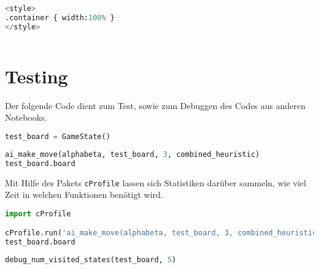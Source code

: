 \begin{lstlisting}[language=Python]
%%HTML
<style>
.container { width:100% }
</style>
\end{lstlisting}

\begin{lstlisting}[language=Python]
%run othello_test_util.ipynb
\end{lstlisting}

\hypertarget{testing}{%
\section{Testing}\label{testing}}

Der folgende Code dient zum Test, sowie zum Debuggen des Codes aus
anderen Notebooks.

\begin{lstlisting}[language=Python]
test_board = GameState()
\end{lstlisting}

\begin{lstlisting}[language=Python]
ai_make_move(alphabeta, test_board, 3, combined_heuristic)
test_board.board
\end{lstlisting}

Mit Hilfe des Pakets \passthrough{\lstinline!cProfile!} lassen sich
Statistiken darüber sammeln, wie viel Zeit in welchen Funktionen
benötigt wird.

\begin{lstlisting}[language=Python]
import cProfile

cProfile.run('ai_make_move(alphabeta, test_board, 3, combined_heuristic)')
test_board.board
\end{lstlisting}

\begin{lstlisting}[language=Python]
debug_num_visited_states(test_board, 5)
\end{lstlisting}
